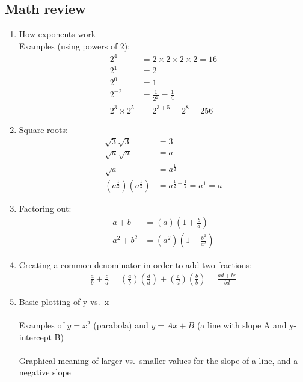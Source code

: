 \documentclass[pagesize,headsepline,10pt,parskip=half]{scrreprt}
\begin{document}
      \subsection{Math review}
        \begin{enumerate}
          \item How exponents work\\
            Examples (using powers of 2):
            \begin{align*}
              2^4 &= 2 \times 2 \times 2 \times 2 = 16\\
              2^1 &= 2\\
              2^0 &= 1\\
              2^{-2} &= \frac{1}{2^2} = \frac{1}{4}\\
              2^3 \times 2^5 &= 2^{3+5} = 2^8 = 256
            \end{align*}
          \item Square roots:
            \begin{align*}
              \sqrt{3} \sqrt{3} &= 3\\
              \sqrt{a} \sqrt{a} &= a\\
              \sqrt{a} &= a^{\frac{1}{2}}\\
              \left(a^{\frac{1}{2}}\right)\left(a^{\frac{1}{2}}\right) &= a^{\frac{1}{2}+\frac{1}{2}} = a^1 = a
            \end{align*}
          \item Factoring out:
            \begin{align*}
              a + b &= \left(a\right)\left(1 + \frac{b}{a}\right)\\
              a^2 + b^2 &= \left(a^2\right)\left(1 + \frac{b^2}{a^2}\right)
            \end{align*}
          \item Creating a common denominator in order to add two fractions:
            \begin{align*}
              \frac{a}{b} + \frac{c}{d}
              = \left(\frac{a}{b}\right)\left(\frac{d}{d}\right) + \left(\frac{c}{d}\right)\left(\frac{b}{b}\right)
              = \frac{ad + bc}{bd}
            \end{align*}
          \item Basic plotting of y vs.\ x \\
            \\
            Examples of $y = x^2$ (parabola) and $y = Ax + B$ (a line with slope A and y-intercept B) \\
            \\
            Graphical meaning of larger vs.\ smaller values for the slope of a line, and a negative slope
        \end{enumerate}
\end{document}

